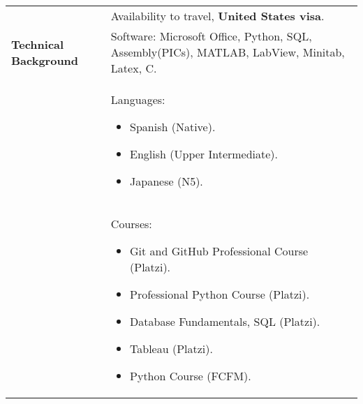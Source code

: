 \documentclass[twoside,letter,openright,10pt]{report}
\begin{document}
\begin{table}[hbt!]
\begin{tabular}{p{40mm}p{140mm}}
\\
& Availability to travel, \textbf{United States visa}.
\\
\textbf{Technical Background}
& Software: Microsoft Office, Python, SQL, Assembly(PICs), MATLAB, LabView, Minitab, Latex, C.
\\
& Languages:
\begin{itemize}[noitemsep,nolistsep]
\item Spanish (Native).
\item English (Upper Intermediate).
\item Japanese (N5).
\vspace{-4mm}
\end{itemize}
\\
& Courses:
\begin{itemize}[noitemsep,nolistsep]
\item Git and GitHub Professional Course (Platzi).
\item Professional Python Course (Platzi).
\item Database Fundamentals, SQL (Platzi).
\item Tableau (Platzi).
\item Python Course (FCFM).
\vspace{-4mm}
\end{itemize}
\end{tabular}
\end{table}
\end{document}

